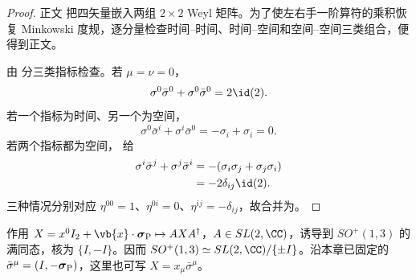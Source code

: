 \begin{proof}
正文 把四矢量嵌入两组 $2\times2$ Weyl 矩阵。为了使左右手一阶算符的乘积恢复 Minkowski 度规，逐分量检查时间--时间、时间--空间和空间--空间三类组合，便得到正文。



由 分三类指标检查。若 $\mu=\nu=0$，
\begin{equation*}
 \sigma^0\bar\sigma^0+\sigma^0\bar\sigma^0=2\id(2).
\end{equation*}
若一个指标为时间、另一个为空间，
\begin{equation*}
 \sigma^0\bar\sigma^i+\sigma^i\bar\sigma^0
 =-\sigma_i+\sigma_i=0.
\end{equation*}
若两个指标都为空间， 给
\begin{align*}
 \sigma^i\bar\sigma^j+\sigma^j\bar\sigma^i
 &=-(\sigma_i\sigma_j+\sigma_j\sigma_i)\\
 &=-2\delta_{ij}\id(2).
\end{align*}
三种情况分别对应 $\eta^{00}=1$、$\eta^{0i}=0$、$\eta^{ij}=-\delta_{ij}$，故合并为。
\end{proof}

\begin{theorem}
作用 $X=x^0I_2+\vb{x}\cdot\boldsymbol\sigma_{\rm P}\mapsto AXA^\dagger$，$A\in SL(2,\CC)$，诱导到 $SO^+(1,3)$ 的满同态，核为 $\{I,-I\}$。因而 $SO^+(1,3)\simeq SL(2,\CC)/\{\pm I\}$。沿本章已固定的 $\bar\sigma^\mu=(I,-\boldsymbol\sigma_{\rm P})$，这里也可写 $X=x_\mu\bar\sigma^\mu$。
\end{theorem}

